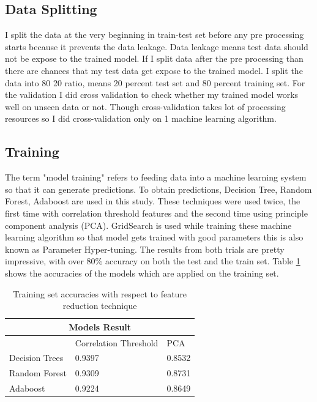 \documentclass[12pt]{article}
\begin{document}
\subsection{Data Splitting}
I split the data at the very beginning in train-test set before any pre processing starts because it prevents the data leakage. Data leakage means test data should not be expose to the trained model. If I split data after the pre processing than there are chances that my test data get expose to the trained model. I split the data into 80 20 ratio, means 20 percent test set and 80 percent training set. For the validation I did cross validation to check whether my trained model works well on unseen data or not. Though cross-validation takes lot of processing resources so I did cross-validation only on 1 machine learning algorithm.

\subsection{Training}
The term "model training" refers to feeding data into a machine learning system so that it can generate predictions. To obtain predictions, Decision Tree, Random Forest, Adaboost are used in this study. These techniques were used twice, the first time with correlation threshold features and the second time using principle component analysis (PCA). GridSearch is used while training these machine learning algorithm so that model gets trained with good parameters this is also known as Parameter Hyper-tuning. The results from both trials are pretty impressive, with over 80$\%$ accuracy on both the test and the train set. Table \ref{table:accuracies} shows the accuracies of the models which are applied on the training set.

\begin{table}[h!]
	\centering
\begin{tabular}{ |p{3cm}|p{3cm}|p{3cm}|  }
	\hline
	\multicolumn{3}{|c|}{Models Result} \\
	\hline
	& Correlation Threshold & PCA \\
	\hline
	Decision Trees & 0.9397 &0.8532 \\
	Random Forest & 0.9309   & 0.8731 \\
	Adaboost &0.9224 & 0.8649 \\
	\hline
\end{tabular}
\caption{Training set accuracies with respect to feature reduction technique}
\label{table:accuracies}
\end{table}
\end{document}
